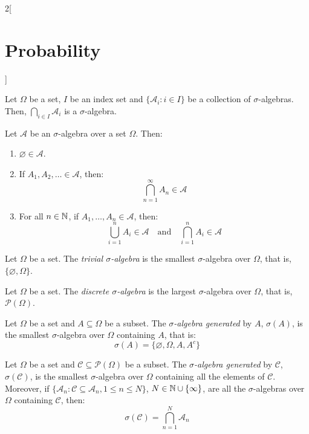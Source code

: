 \documentclass[../../../main_math.tex]{subfiles}
\begin{document}
\begin{multicols}{2}[\section{Probability}]
\begin{definition}
\begin{enumerate}
    \end{enumerate}
  \end{definition}
  \begin{proposition}
    Let $\Omega$ be a set, $I$ be an index set and $\{\mathcal{A}_i:i\in I\}$ be a collection of $\sigma$-algebras. Then, $\bigcap_{i\in I} \mathcal{A}_i$ is a $\sigma$-algebra.
  \end{proposition}
  \begin{proposition}
    Let $\mathcal{A}$ be an $\sigma$-algebra over a set $\Omega$. Then:
    \begin{enumerate}
      \item $\varnothing\in\mathcal{A}$.
      \item If $A_1,A_2,\ldots\in\mathcal{A}$, then: $$\bigcap_{n=1}^\infty A_n\in\mathcal{A}$$
      \item For all $n\in\mathbb{N}$, if $A_1,\ldots,A_n\in\mathcal{A}$, then: $$\bigcup_{i=1}^nA_i\in\mathcal{A}\quad\text{and}\quad\bigcap_{i=1}^nA_i\in\mathcal{A}$$
    \end{enumerate}
  \end{proposition}
  \begin{definition}
    Let $\Omega$ be a set. The \emph{trivial $\sigma$-algebra} is the smallest $\sigma$-algebra over $\Omega$, that is, $\{\varnothing,\Omega\}$.
  \end{definition}
  \begin{definition}
    Let $\Omega$ be a set. The \emph{discrete $\sigma$-algebra} is the largest $\sigma$-algebra over $\Omega$, that is, $\mathcal{P}(\Omega)$.
  \end{definition}
  \begin{definition}
    Let $\Omega$ be a set and $A\subseteq\Omega$ be a subset. The \emph{$\sigma$-algebra generated} by $A$, $\sigma(A)$, is the smallest $\sigma$-algebra over $\Omega$ containing $A$, that is: $$\sigma(A)=\{\varnothing,\Omega,A,A^c\}$$
  \end{definition}
  \begin{definition}
    Let $\Omega$ be a set and $\mathcal{C}\subseteq\mathcal{P}(\Omega)$ be a subset. The \emph{$\sigma$-algebra generated} by $\mathcal{C}$, $\sigma(\mathcal{C})$, is the smallest $\sigma$-algebra over $\Omega$ containing all the elements of $\mathcal{C}$. Moreover, if $\{\mathcal{A}_n:\mathcal{C}\subseteq\mathcal{A}_n,1\leq n\leq N\}$, $N\in\mathbb{N}\cup\{\infty\}$, are all the $\sigma$-algebras over $\Omega$ containing $\mathcal{C}$, then:
    $$\sigma(\mathcal{C})=\bigcap_{n=1}^N\mathcal{A}_n$$
  \end{definition}

\end{multicols}
\end{document}
